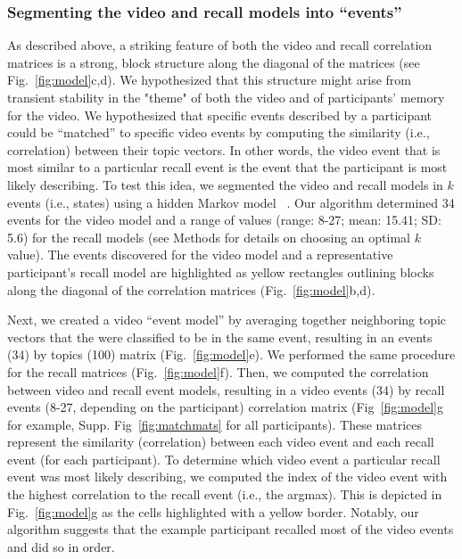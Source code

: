 \documentclass{article}
\begin{document}
\subsubsection{Segmenting the video and recall models into ``events''}
As described above, a striking feature of both the video and recall correlation matrices is a strong, block structure along the diagonal of the matrices (see Fig.~\ref{fig:model}c,d).  We hypothesized that this structure might arise from transient stability in the "theme" of both the video and of participants' memory for the video. We hypothesized that specific events described by a participant could be ``matched'' to specific video events by computing the similarity (i.e., correlation) between their topic vectors. In other words, the video event that is most similar to a particular recall event is the event that the participant is most likely describing. To test this idea, we segmented the video and recall models in $k$ events (i.e., states) using a hidden Markov model ~\citep{BaldEtal17}. Our algorithm determined 34 events for the video model and a range of values (range: 8-27; mean: 15.41; SD: 5.6) for the recall models (see Methods for details on choosing an optimal $k$ value).  The events discovered for the video model and a representative participant's recall model are highlighted as yellow rectangles outlining blocks along the diagonal of the correlation matrices (Fig.~\ref{fig:model}b,d).

Next, we created a video ``event model'' by averaging together neighboring topic vectors that the were classified to be in the same event, resulting in an events (34) by topics (100) matrix (Fig.~\ref{fig:model}e).  We performed the same procedure for the recall matrices (Fig.~\ref{fig:model}f). Then, we computed the correlation between video and recall event models, resulting in a video events (34) by recall events (8-27, depending on the participant) correlation matrix (Fig~\ref{fig:model}g for example, Supp. Fig~\ref{fig:matchmats} for all participants). These matrices represent the similarity (correlation) between each video event and each recall event (for each participant). To determine which video event a particular recall event was most likely describing, we computed the index of the video event with the highest correlation to the recall event (i.e., the argmax).  This is depicted in Fig.~\ref{fig:model}g as the cells highlighted with a yellow border. Notably, our algorithm suggests that the example participant recalled most of the video events and did so in order.
\end{document}
